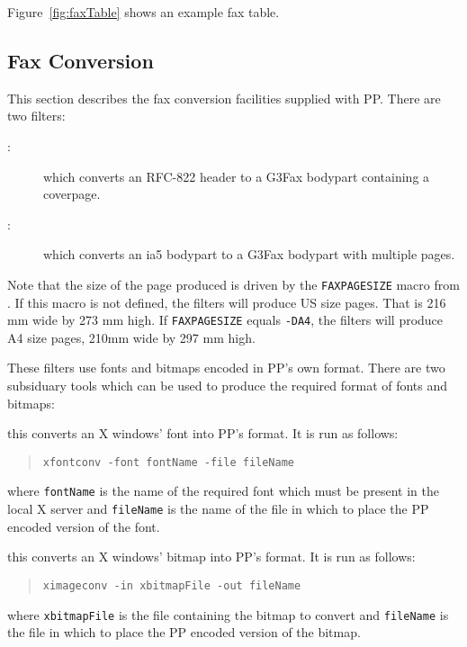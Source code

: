 Figure~\ref{fig:faxTable} shows an example fax table.


\subsection {Fax Conversion} \label{sect:faxconv}

This section describes the fax conversion facilities supplied with PP.
There are two filters:
\begin{description}
\item [:] which converts an RFC-822 header to a G3Fax
bodypart containing a coverpage.
\item [:] which converts an ia5 bodypart to a G3Fax
bodypart with multiple pages.
\end{description}
Note that the size of the page produced is driven by the
\verb+FAXPAGESIZE+ macro from .
If this macro is not defined, the filters will produce US size pages.
That is 216 mm wide by 273 mm high.
If \verb+FAXPAGESIZE+ equals \verb+-DA4+, the filters will produce A4
size pages, 210mm wide by 297 mm high.

These filters use fonts and bitmaps encoded in PP's own format.
There are two subsiduary tools which can be used to produce the
required format of fonts and bitmaps:
\begin{describe}
\item[\verb+xfontconv+:] this converts an X windows' font into PP's
format.
It is run as follows:
\begin{quote}\begin{verbatim}
xfontconv -font fontName -file fileName
\end{verbatim}\end{quote}
where \verb+fontName+ is the name of the required font which must be
present in the local X server and \verb+fileName+ is the name of the
file in which to place the PP encoded version of the font.

\item[\verb+ximageconv+:] this converts an X windows' bitmap into PP's
format.
It is run as follows:
\begin{quote}\begin{verbatim}
ximageconv -in xbitmapFile -out fileName
\end{verbatim}\end{quote}
where \verb+xbitmapFile+ is the file containing the bitmap to convert
and \verb+fileName+ is the file in which to place the PP encoded
version of the bitmap.
\end{describe}

